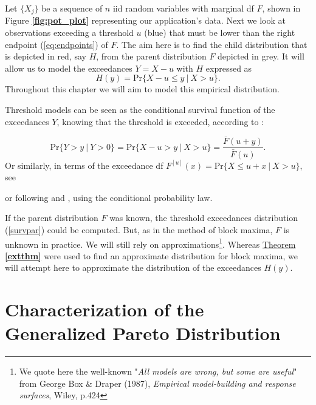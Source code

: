 Let $\{X_j\}$ be a sequence of $n$ iid random variables with marginal df $F$, shown in Figure \textbf{\ref{fig:pot_plot}} representing our application's data. Next we look at observations exceeding a threshold $u$ (blue) that must be lower than the right endpoint (\ref{eq:endpoints}) of $F$. The aim here is to find the child distribution that is depicted in red, say $H$, from the parent distribution $F$ depicted in grey. It will allow us to model the exceedances $Y=X-u$ with $H$ expressed as \begin{equation*}
H(y)=\text{Pr}\{X-u\leq y \ | \ X>u\}.
\end{equation*}
Throughout this chapter we will aim to model this empirical distribution.

Threshold models can be seen as the conditional survival function of the exceedances $Y$, knowing that the threshold is exceeded, according to \citet[pp.147]{beirlant_statistics_2006} :


\begin{equation}\label{survpar}
\text{Pr}\big\{Y>y\ |\ Y>0\big\}=\text{Pr}\big\{X-u>y\ |\ X>u\big\}=\frac{\bar{F}(u+y)}{\bar{F}(u)}.
\end{equation}
Or similarly, in terms of the exceedance df $F^{[u]}(x)=\text{Pr}\{X\leq u+x \ | \ X>u\}$, see \citet[pp.25-29]{reiss_statistical_2007}

or following \citet{charras_extreme_2013} and \citet{rosso_extreme_2015}, using the conditional probability law. %

If the parent distribution $F$ was known, the threshold exceedances distribution (\ref{survpar}) could be computed. But, as in the method of block maxima, $F$ is unknown in practice. We will still rely on approximations\footnote{We quote here the well-known "\textit{All models are wrong, but some are useful}" from George Box \& Draper (1987), \textit{Empirical model-building and response surfaces}, Wiley, p.424}. Whereas \hyperref[extthm]{Theorem \textbf{\ref{extthm}}} were used to find an approximate distribution for block maxima, we will attempt here to approximate the distribution of the exceedances $H(y)$.


\section{Characterization of the Generalized Pareto Distribution}\label{sec:charac_gpd}

